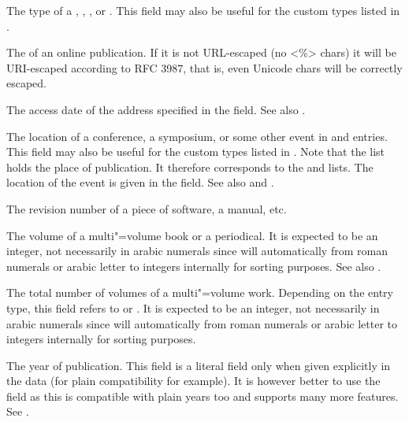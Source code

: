 \documentclass{ltxdockit}[2011/03/25]
\newcommand*{\biber}{\sty{biber}\xspace}
\begin{document}
\begin{fieldlist}

The type of a , , , or . This field may also be useful for the custom types listed in .


The  of an online publication. If it is not URL-escaped (no <\%> chars) it will be URI-escaped according to RFC 3987, that is, even Unicode chars will be correctly escaped.


The access date of the address specified in the  field. See also .


The location of a conference, a symposium, or some other event in  and  entries. This field may also be useful for the custom types listed in . Note that the  list holds the place of publication. It therefore corresponds to the  and  lists. The location of the event is given in the  field. See also  and .


The revision number of a piece of software, a manual, etc.


The volume of a multi"=volume book or a periodical. It is expected to be an integer, not necessarily in arabic numerals since \biber will automatically from roman numerals or arabic letter to integers internally for sorting purposes. See also .


The total number of volumes of a multi"=volume work. Depending on the entry type, this field refers to  or . It is expected to be an integer, not necessarily in arabic numerals since \biber will automatically from roman numerals or arabic letter to integers internally for sorting purposes.


The year of publication. This field is a literal field only when given
explicitly in the data (for plain \bibtex compatibility for example). It is
however better to use the  field as this is compatible with
plain years too and supports many more features. See .

\end{fieldlist}
\end{document}
